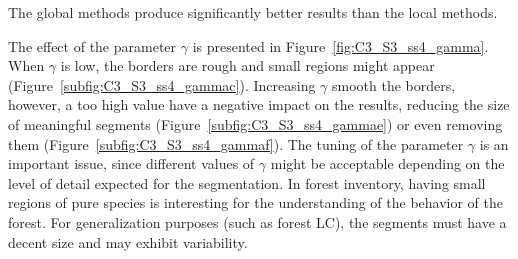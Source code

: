 The global methods produce significantly better results than the local methods.

The effect of the parameter $\gamma$ is presented in Figure~\ref{fig:C3_S3_ss4_gamma}. When $\gamma$ is low, the borders are rough and small regions might appear (Figure~\ref{subfig:C3_S3_ss4_gammac}). Increasing $\gamma$ smooth the borders, however, a too high value have a negative impact on the results, reducing the size of meaningful segments (Figure~\ref{subfig:C3_S3_ss4_gammae}) or even removing them (Figure~\ref{subfig:C3_S3_ss4_gammaf}). The tuning of the parameter $\gamma$ is an important issue, since different values of $\gamma$ might be acceptable depending on the level of detail expected for the segmentation. In forest inventory, having small regions of pure species is interesting for the understanding of the behavior of the forest. For generalization purposes (such as forest LC), the segments must have a decent size and may exhibit variability.


